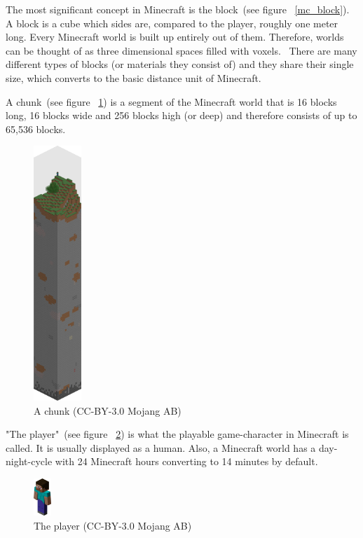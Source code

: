 The most significant concept in Minecraft is the block~(see figure ~\ref{mc_block}). A block is a cube which sides are, compared to the player, roughly one meter long. Every Minecraft world is built up entirely out of them. Therefore, worlds can be thought of as three dimensional spaces filled with voxels.~\cite{baloghcodemetropolis} There are many different types of blocks (or materials they consist of) and they share their single size, which converts to the basic distance unit of Minecraft.

A chunk~(see figure ~\ref{mc_chunk}) is a segment of the Minecraft world that is 16 blocks long, 16 blocks wide and 256 blocks high (or deep) and therefore consists of up to 65,536 blocks.~\cite{mcwiki_chunks}

\begin{figure}
  \begin{center}
    \includegraphics[width=0.16\textwidth]{graphics/chunk}
  \end{center}
  \caption{A chunk (CC-BY-3.0 Mojang AB) \cite{image_mob}}
  \label{mc_chunk}
\end{figure} 

"The player"~(see figure ~\ref{mc_player}) is what the playable game-character in Minecraft is called. It is usually displayed as a human.
Also, a Minecraft world has a day-night-cycle with 24 Minecraft hours converting to 14 minutes by default.

\begin{figure}
  \begin{center}
    \includegraphics[width=0.06\textwidth]{graphics/player}
  \end{center}
  \caption{The player (CC-BY-3.0 Mojang AB) \cite{image_mob}}
  \label{mc_player}
\end{figure} 

